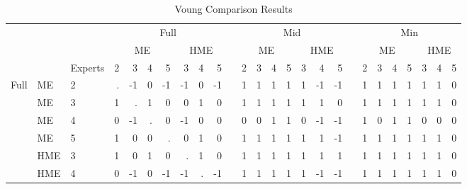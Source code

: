 \documentclass[12pt]{article}
\theoremstyle{definition}
\begin{document}
\begin{landscape}
\begin{table}[t!] \centering
  \caption{Voung Comparison Results}
  \begin{threeparttable}
    {\footnotesize
    \begin{tabular}[r]{l l l r r r r r r r r r r r r r r r r r r r r r r r}
    \cmidrule{1-26}
         &     &         &  \multicolumn{7}{c}{Full}                         &&  \multicolumn{7}{c}{Mid}                          &&  \multicolumn{7}{c}{Min}                         \\
         &     &         &  \multicolumn{4}{c}{ME} & \multicolumn{3}{c}{HME} &&  \multicolumn{4}{c}{ME} & \multicolumn{3}{c}{HME} && \multicolumn{4}{c}{ME} & \multicolumn{3}{c}{HME} \\
                            \cmidrule(lr){4-7} \cmidrule(lr){8-10}              \cmidrule(lr){12-15} \cmidrule(lr){16-18}             \cmidrule(lr){20-23} \cmidrule(lr){24-26}
         &     & Experts & 2   &  3  &  4  &  5  &  3   &  4   &  5          && 2   &  3  &  4  &  5  &  3   &  4   &  5          &&  2  &  3  &  4  &  5  &  3   &  4   &  5         \\
    \cmidrule{3-26}
Full     & ME  & 2       &  .  & -1  &  0  & -1  & -1   &  0   &  -1          &&  1  &   1 &  1  &  1  &  1   & -1   &  -1          &&  1  &  1  &  1  &  1  &  1   &  1   &  0       \\
         & ME  & 3       &  1  &  .  &  1  &  0  &  0   &  1   &   0          &&  1  &   1 &  1  &  1  &  1   &  1   &   0          &&  1  &  1  &  1  &  1  &  1   &  1   &  0       \\
         & ME  & 4       &  0  & -1  &  .  &  0  & -1   &  0   &   0          &&  0  &   0 &  1  &  1  &  0   & -1   &  -1          &&  1  &  0  &  1  &  1  &  0   &  0   &  0       \\
         & ME  & 5       &  1  &  0  &  0  &  .  &  0   &  1   &   0          &&  1  &   1 &  1  &  1  &  1   &  1   &  -1          &&  1  &  1  &  1  &  1  &  1   &  1   &  0       \\
         & HME & 3       &  1  &  0  &  1  &  0  &  .   &  1   &   0          &&  1  &   1 &  1  &  1  &  1   &  1   &   1          &&  1  &  1  &  1  &  1  &  1   &  1   &  0       \\
         & HME & 4       &  0  & -1  &  0  & -1  & -1   &  .   &  -1          &&  1  &   1 &  1  &  1  &  1   & -1   &  -1          &&  1  &  1  &  1  &  1  &  1   &  1   &  0       \\

\end{tabular}}
\end{threeparttable}
\end{table}
\end{landscape}
\end{document}
